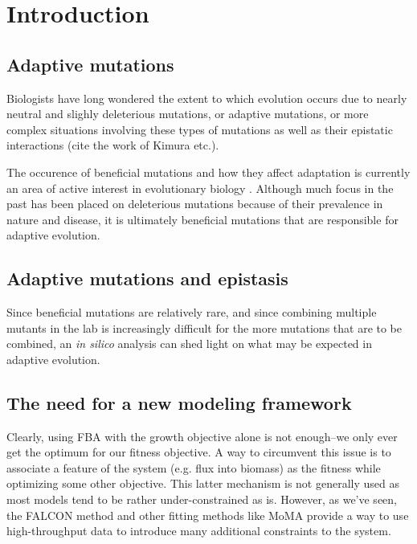 \section{Introduction}

\subsection{Adaptive mutations}

Biologists have long wondered the extent to which evolution occurs due
to nearly neutral and slighly deleterious mutations, or adaptive
mutations, or more complex situations involving these types of
mutations as well as their epistatic interactions (cite the work of
Kimura etc.).

The occurence of beneficial mutations and how they affect adaptation
is currently an area of active interest in evolutionary biology
\citep{Chou2011, Weinreich2006}. Although much focus in the past
has been placed on deleterious mutations because of their prevalence
in nature and disease, it is ultimately beneficial mutations that
are responsible for adaptive evolution.
 
\subsection{Adaptive mutations and epistasis}


Since beneficial mutations are relatively rare, and since
combining multiple mutants in the lab is increasingly difficult for
the more mutations that are to be combined, an \textit{in silico}
analysis can shed light on what may be expected in adaptive
evolution.



\subsection{The need for a new modeling framework}
Clearly, using FBA with the growth objective alone is not enough--we
only ever get the optimum for our fitness objective.  A way to
circumvent this issue is to associate a feature of the system
(e.g. flux into biomass) as the fitness while optimizing some other
objective. This latter mechanism is not generally used as most models
tend to be rather under-constrained as is. However, as we've seen, the
FALCON method 
and other fitting methods like MoMA provide a
way to use high-throughput data to introduce many additional
constraints to the system.

